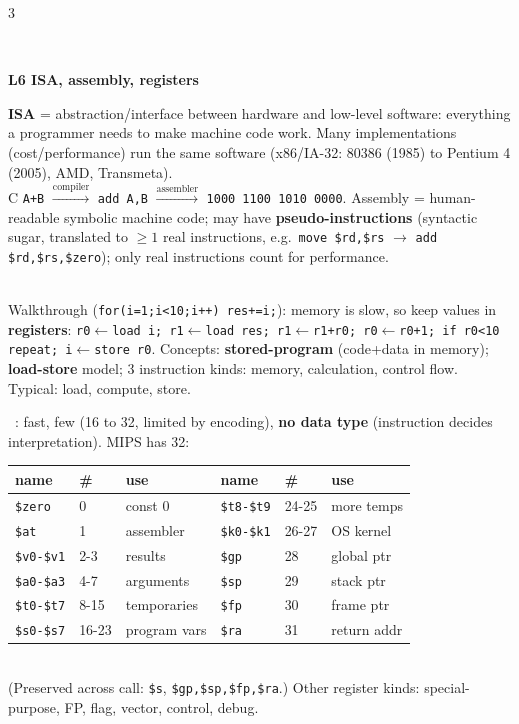 \documentclass[landscape]{article}
\newcommand{\sect}[1]{\par\vspace{2pt}\noindent{\color{cur}\rule[-1.5pt]{\linewidth}{0.4pt}}\\[-7.5pt]%
  \noindent\colorbox{cur!12}{\parbox{\dimexpr\linewidth-2\fboxsep}{\color{cur}\bfseries #1}}\par\vspace{0.5pt}}
\newcommand{\sub}[1]{\par\vspace{1pt}{\color{cur}\bfseries #1}\ }
\newcommand{\key}[1]{\textbf{\color{BrickRed}#1}}
\newcommand{\tc}[1]{\texttt{#1}}
\begin{document}
\begin{multicols*}{3}
\sect{L6 \; ISA, assembly, registers}
\key{ISA} = abstraction/interface between hardware and low-level software: everything a programmer needs to make machine code work. Many implementations (cost/performance) run the same software (x86/IA-32: 80386 (1985) to Pentium 4 (2005), AMD, Transmeta).\\
C \tc{A+B} $\xrightarrow{\text{compiler}}$ \tc{add A,B} $\xrightarrow{\text{assembler}}$ \tc{1000 1100 1010 0000}. Assembly = human-readable symbolic machine code; may have \key{pseudo-instructions} (syntactic sugar, translated to $\ge1$ real instructions, e.g.\ \tc{move \$rd,\$rs} $\to$ \tc{add \$rd,\$rs,\$zero}); only real instructions count for performance.\\
\\
Walkthrough (\tc{for(i=1;i<10;i++) res+=i;}): memory is slow, so keep values in \key{registers}: \tc{r0$\leftarrow$load i; r1$\leftarrow$load res; r1$\leftarrow$r1+r0; r0$\leftarrow$r0+1; if r0<10 repeat; i$\leftarrow$store r0}. Concepts: \key{stored-program} (code+data in memory); \key{load-store} model; 3 instruction kinds: memory, calculation, control flow. Typical: load, compute, store.\\
\sub{Registers}: fast, few (16 to 32, limited by encoding), \key{no data type} (instruction decides interpretation). MIPS has 32:\\
\begin{tabular}{@{}lll|lll@{}}\toprule
name & \# & use & name & \# & use\\\midrule
\tc{\$zero} & 0 & const 0 & \tc{\$t8-\$t9} & 24-25 & more temps\\
\tc{\$at} & 1 & assembler & \tc{\$k0-\$k1} & 26-27 & OS kernel\\
\tc{\$v0-\$v1} & 2-3 & results & \tc{\$gp} & 28 & global ptr\\
\tc{\$a0-\$a3} & 4-7 & arguments & \tc{\$sp} & 29 & stack ptr\\
\tc{\$t0-\$t7} & 8-15 & temporaries & \tc{\$fp} & 30 & frame ptr\\
\tc{\$s0-\$s7} & 16-23 & program vars & \tc{\$ra} & 31 & return addr\\\bottomrule
\end{tabular}\\
(Preserved across call: \tc{\$s}, \tc{\$gp,\$sp,\$fp,\$ra}.) Other register kinds: special-purpose, FP, flag, vector, control, debug.


\end{multicols*}
\end{document}
